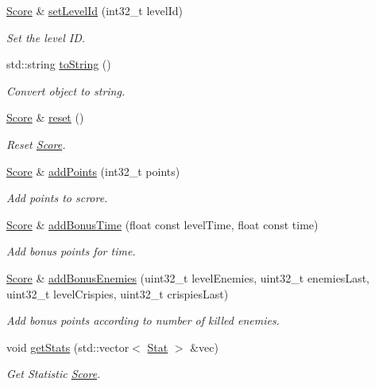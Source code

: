 \begin{DoxyCompactItemize}
\hyperlink{class_score}{Score} \& \hyperlink{class_score_a6b5ea89d47e54eb743c7a7795719e171}{set\+Level\+Id} (int32\+\_\+t level\+Id)
\begin{DoxyCompactList}\small\item\em Set the level ID. \end{DoxyCompactList}\item 
std\+::string \hyperlink{class_score_a543e8e801da09051ed563c11ab80ae12}{to\+String} ()
\begin{DoxyCompactList}\small\item\em Convert object to string. \end{DoxyCompactList}\item 
\hyperlink{class_score}{Score} \& \hyperlink{class_score_a8ee59cdc6c44f0ad80feb01219d3357d}{reset} ()
\begin{DoxyCompactList}\small\item\em Reset \hyperlink{class_score}{Score}. \end{DoxyCompactList}\item 
\hyperlink{class_score}{Score} \& \hyperlink{class_score_abc3dd0d8a5e18ef31c83ad1a97c9f51b}{add\+Points} (int32\+\_\+t points)
\begin{DoxyCompactList}\small\item\em Add points to scrore. \end{DoxyCompactList}\item 
\hyperlink{class_score}{Score} \& \hyperlink{class_score_aec14e494705073af4c32793bd14c6493}{add\+Bonus\+Time} (float const level\+Time, float const time)
\begin{DoxyCompactList}\small\item\em Add bonus points for time. \end{DoxyCompactList}\item 
\hyperlink{class_score}{Score} \& \hyperlink{class_score_a8b9bb1db9ddc8144378adfd81c6899aa}{add\+Bonus\+Enemies} (uint32\+\_\+t level\+Enemies, uint32\+\_\+t enemies\+Last, uint32\+\_\+t level\+Crispies, uint32\+\_\+t crispies\+Last)
\begin{DoxyCompactList}\small\item\em Add bonus points according to number of killed enemies. \end{DoxyCompactList}\item 
void \hyperlink{class_score_a7155b0d7742004972bb115a56d734fa6}{get\+Stats} (std\+::vector$<$ \hyperlink{struct_score_1_1_stat}{Stat} $>$ \&vec)
\begin{DoxyCompactList}\small\item\em Get Statistic \hyperlink{class_score}{Score}. \end{DoxyCompactList}\end{DoxyCompactItemize}
